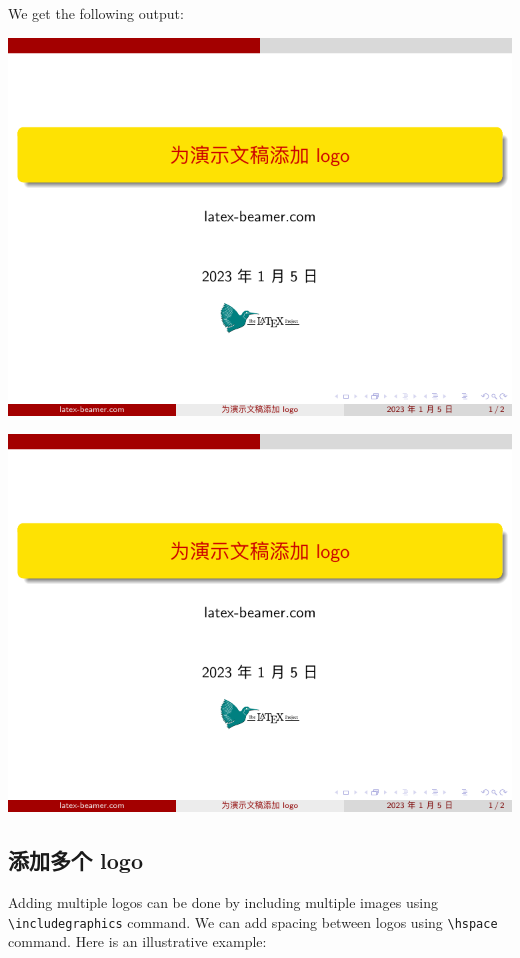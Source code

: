 \inputminted[linenos=true]{latex}{examples/beamer/beamerlogo02.tex}

We get the following output:

\includegraphics[page=1]{examples/beamer/beamerlogo02.pdf}

\includegraphics[page=2]{examples/beamer/beamerlogo02.pdf}

\subsection{添加多个 logo}

Adding multiple logos can be done by including multiple images using \verb|\includegraphics| command. We can add spacing between logos using \verb|\hspace| command. Here is an illustrative example:

